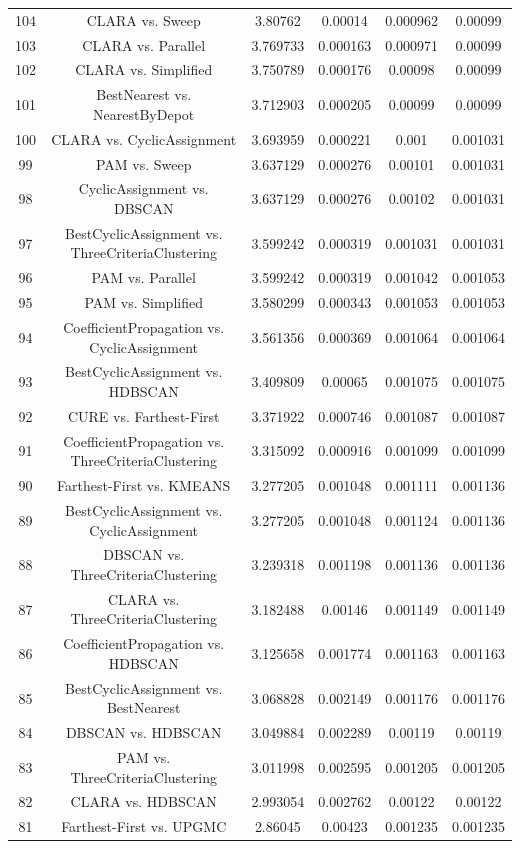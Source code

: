 \documentclass[a4paper,10pt]{article}
\begin{document}
\begin{landscape}
\begin{table}[!htp]
\begin{tabular}{cccccc}
104&CLARA vs. Sweep&3.80762&0.00014&0.000962&0.00099\\
103&CLARA vs. Parallel&3.769733&0.000163&0.000971&0.00099\\
102&CLARA vs. Simplified&3.750789&0.000176&0.00098&0.00099\\
101&BestNearest vs. NearestByDepot&3.712903&0.000205&0.00099&0.00099\\
100&CLARA vs. CyclicAssignment&3.693959&0.000221&0.001&0.001031\\
99&PAM vs. Sweep&3.637129&0.000276&0.00101&0.001031\\
98&CyclicAssignment vs. DBSCAN&3.637129&0.000276&0.00102&0.001031\\
97&BestCyclicAssignment vs. ThreeCriteriaClustering&3.599242&0.000319&0.001031&0.001031\\
96&PAM vs. Parallel&3.599242&0.000319&0.001042&0.001053\\
95&PAM vs. Simplified&3.580299&0.000343&0.001053&0.001053\\
94&CoefficientPropagation vs. CyclicAssignment&3.561356&0.000369&0.001064&0.001064\\
93&BestCyclicAssignment vs. HDBSCAN&3.409809&0.00065&0.001075&0.001075\\
92&CURE vs. Farthest-First&3.371922&0.000746&0.001087&0.001087\\
91&CoefficientPropagation vs. ThreeCriteriaClustering&3.315092&0.000916&0.001099&0.001099\\
90&Farthest-First vs. KMEANS&3.277205&0.001048&0.001111&0.001136\\
89&BestCyclicAssignment vs. CyclicAssignment&3.277205&0.001048&0.001124&0.001136\\
88&DBSCAN vs. ThreeCriteriaClustering&3.239318&0.001198&0.001136&0.001136\\
87&CLARA vs. ThreeCriteriaClustering&3.182488&0.00146&0.001149&0.001149\\
86&CoefficientPropagation vs. HDBSCAN&3.125658&0.001774&0.001163&0.001163\\
85&BestCyclicAssignment vs. BestNearest&3.068828&0.002149&0.001176&0.001176\\
84&DBSCAN vs. HDBSCAN&3.049884&0.002289&0.00119&0.00119\\
83&PAM vs. ThreeCriteriaClustering&3.011998&0.002595&0.001205&0.001205\\
82&CLARA vs. HDBSCAN&2.993054&0.002762&0.00122&0.00122\\
81&Farthest-First vs. UPGMC&2.86045&0.00423&0.001235&0.001235\\

\end{tabular}
\end{table}
\end{landscape}
\end{document}
